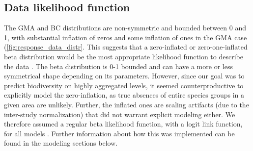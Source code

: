 
\subsection*{Data likelihood function}

The GMA and BC distributions are non-symmetric and bounded between 0 and 1, with substantial inflation of zeros and some inflation of ones in the GMA case (\autoref{fig:response_data_distr}. This suggests that a zero-inflated or zero-one-inflated beta distribution would be the most appropriate likelihood function to describe the data \cite{ospina2010}. The beta distribution is 0-1 bounded and can have a more or less symmetrical shape depending on its parameters. However, since our goal was to predict biodiversity on highly aggregated levels, it seemed counterproductive to explicitly model the zero-inflation, as true absences of entire species groups in a given area are unlikely. Further, the inflated ones are scaling artifacts (due to the inter-study normalization) that did not warrant explicit modeling either. We therefore assumed a regular beta likelihood function, with a logit link function, for all models \cite{ferrari2004}. Further information about how this was implemented can be found in the modeling sections below.

\vspace{\baselineskip}

